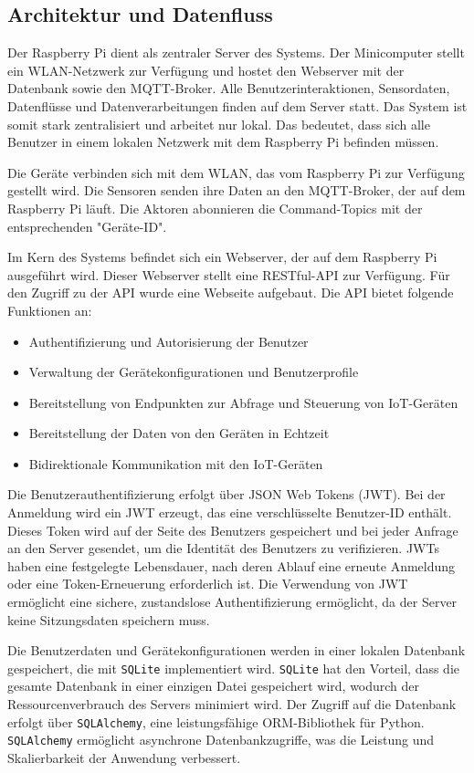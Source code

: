 \documentclass[12pt, letterpaper]{article}
\begin{document}
\subsection{Architektur und Datenfluss}
\par Der Raspberry Pi dient als zentraler Server des Systems. Der Minicomputer stellt ein WLAN-Netzwerk zur Verfügung und hostet den Webserver mit der Datenbank sowie den MQTT-Broker. Alle Benutzerinteraktionen, Sensordaten, Datenflüsse und Datenverarbeitungen finden auf dem Server statt. Das System ist somit stark zentralisiert und arbeitet nur lokal. Das bedeutet, dass sich alle Benutzer in einem lokalen Netzwerk mit dem Raspberry Pi befinden müssen. 
\par Die Geräte verbinden sich mit dem WLAN, das vom Raspberry Pi zur Verfügung gestellt wird. Die Sensoren senden ihre Daten an den MQTT-Broker, der auf dem Raspberry Pi läuft. Die Aktoren abonnieren die Command-Topics mit der entsprechenden "Geräte-ID".
\par Im Kern des Systems befindet sich ein Webserver, der auf dem Raspberry Pi ausgeführt wird. Dieser Webserver stellt eine RESTful-API zur Verfügung. Für den Zugriff zu der API wurde eine Webseite aufgebaut. Die API bietet folgende Funktionen an:
\begin{itemize}
  \item Authentifizierung und Autorisierung der Benutzer
  \item Verwaltung der Gerätekonfigurationen und Benutzerprofile
  \item Bereitstellung von Endpunkten zur Abfrage und Steuerung von IoT-Geräten
  \item Bereitstellung der Daten von den Geräten in Echtzeit
  \item Bidirektionale Kommunikation mit den IoT-Geräten
\end{itemize}
\par Die Benutzerauthentifizierung erfolgt über JSON Web Tokens (JWT). Bei der Anmeldung wird ein JWT erzeugt, das eine verschlüsselte Benutzer-ID enthält. Dieses Token wird auf der Seite des Benutzers gespeichert und bei jeder Anfrage an den Server gesendet, um die Identität des Benutzers zu verifizieren. JWTs haben eine festgelegte Lebensdauer, nach deren Ablauf eine erneute Anmeldung oder eine Token-Erneuerung erforderlich ist. Die Verwendung von JWT ermöglicht eine sichere, zustandslose Authentifizierung ermöglicht, da der Server keine Sitzungsdaten speichern muss.
\par Die Benutzerdaten und Gerätekonfigurationen werden in einer lokalen Datenbank gespeichert, die mit \texttt{SQLite} implementiert wird. \texttt{SQLite} hat den Vorteil, dass die gesamte Datenbank in einer einzigen Datei gespeichert wird, wodurch der Ressourcenverbrauch des Servers minimiert wird. Der Zugriff auf die Datenbank erfolgt über \texttt{SQLAlchemy}, eine leistungsfähige ORM-Bibliothek für Python. \texttt{SQLAlchemy} ermöglicht asynchrone Datenbankzugriffe, was die Leistung und Skalierbarkeit der Anwendung verbessert.
\end{document}
